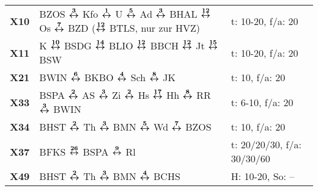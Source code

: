 \begin{minipage}[t]{0.45\textwidth}
\begin{tabular}{>{\bfseries}L{1.2cm}L{9.0cm}L{3.0cm}}
\xbus{} X10   & BZOS $\xarwe{3}$ Kfo $\xarwe{1}$ U $\xarwe{5}$ Ad $\xarwe{3}$ BHAL $\xarwe{12}$ Os $\xarwe{7}$ BZD ($\xarwe{12}$ BTLS, nur zur HVZ)                                 & t: 10-20, f/a: 20          \\
\xbus{} X11   & K $\xarwe{10}$ BSDG $\xarwe{14}$ BLIO $\xarwe{12}$ BBCH $\xarwe{12}$ Jt $\xarwe{15}$ BSW                                                                            & t: 10-20, f/a: 20          \\
\xbus{} X21   & BWIN $\xarwe{6}$ BKBO $\xarwe{4}$ Sch $\xarwe{8}$ JK                                                                                                                & t: 10, f/a: 20             \\
\xbus{} X33   & BSPA $\xarwe{2}$ AS $\xarwe{3}$ Zi $\xarwe{2}$ Hs $\xarwe{17}$ Hh $\xarwe{8}$ RR $\xarwe{3}$ BWIN                                                                   & t: 6-10, f/a: 20           \\
\xbus{} X34   & BHST $\xarwe{2}$ Th $\xarwe{3}$ BMN $\xarwe{5}$ Wd $\xarwe{7}$ BZOS                                                                                                 & t: 10, f/a: 20             \\
\xbus{} X37   & BFKS $\xarwe{26}$ BSPA $\xarwe{9}$ Rl                                                & t: 20/20/30, f/a: 30/30/60 \\ 
\xbus{} X49   & BHST $\xarwe{2}$ Th $\xarwe{3}$ BMN $\xarwe{4}$ BCHS                                                                                                                & H: 10-20, So: --           \\
\hline
\end{tabular}
\end{minipage}
